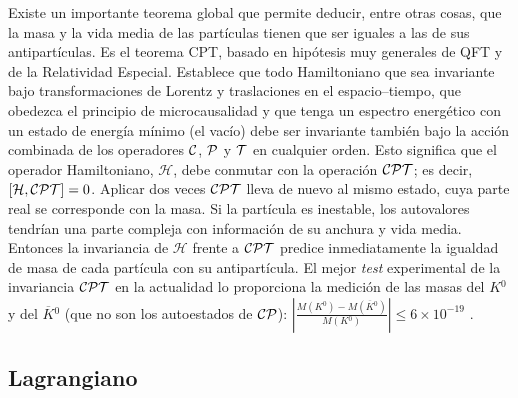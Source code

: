 Existe un importante teorema global que permite deducir, entre otras cosas, que la masa y la vida media de las partículas tienen que ser iguales a las de sus  antipartículas. Es el teorema CPT, basado en hipótesis muy generales de QFT y de la Relatividad Especial. Establece que todo  Hamiltoniano que sea  invariante bajo transformaciones de  Lorentz y traslaciones en el espacio--tiempo, que obedezca el principio de  microcausalidad y que tenga un espectro energético con un estado de energía mínimo (el vacío) debe ser  invariante también bajo la acción combinada de los operadores $\mathcal{C}$, $\mathcal{P}$ y $\mathcal{T}$ en cualquier orden. Esto significa que el operador  Hamiltoniano, $\mathcal{ H}$, debe  conmutar con la operación $\mathcal{CP}\mathcal{T}$; es decir, $[\mathcal{ H},\mathcal{CP}\mathcal{T}] = 0$.
Aplicar dos veces $\mathcal{CP}\mathcal{T}$ lleva de nuevo al mismo estado, cuya parte real se corresponde con la masa. Si la partícula es inestable, los autovalores tendrían una parte compleja con información de su anchura y vida media. 
Entonces la  invariancia de $\mathcal{ H}$ frente a $\mathcal{CP}\mathcal{T}$  predice inmediatamente la igualdad de masa de cada partícula con su  antipartícula.
El mejor \textit{test} experimental de la  invariancia $\mathcal{CP}\mathcal{T}$ en la actualidad lo proporciona la medición de las masas del $ K{}^0$ y del $\overline{ K}{}^0$ (que no son los  autoestados de $\mathcal{CP}$): $\left|\frac{ M( K{}^0) -  M(\overline{K}{}^0)}{ M( K{}^0)} \right| \leq 6 \times 10^{-19}$ \cite{pdg2018}.



\color{norm}

\subsection{Lagrangiano} %
\label{sec_yukawa}

